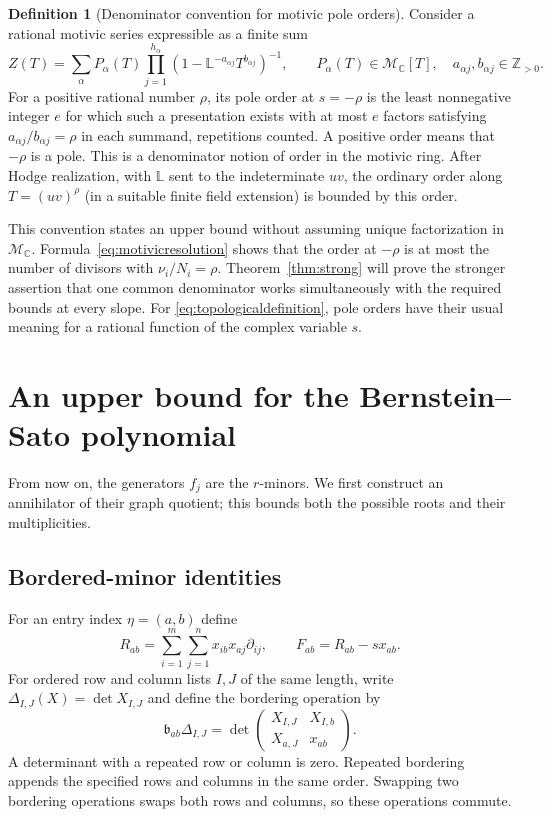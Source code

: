 \documentclass[11pt,a4paper]{article}
\numberwithin{equation}{section}
\theoremstyle{definition}
\newtheorem{definition}[theorem]{Definition}
\newcommand{\C}{\mathbb C}
\newcommand{\Z}{\mathbb Z}
\begin{document}
\begin{definition}[Denominator convention for motivic pole orders]
\label{def:motivicorder}
Consider a rational motivic series expressible as a finite sum
\begin{equation}\label{eq:denominatorpresentation}
Z(T)=\sum_{\alpha}P_\alpha(T)
          \prod_{j=1}^{h_\alpha}
           (1-\mathbb L^{-a_{\alpha j}}T^{b_{\alpha j}})^{-1},
\qquad
P_\alpha(T)\in\mathcal M_{\C}[T],\quad
 a_{\alpha j},b_{\alpha j}\in\Z_{>0}.
\end{equation}
For a positive rational number $\rho$, its pole order at
$s=-\rho$ is the least nonnegative integer $e$ for which such a
presentation exists with at most $e$ factors satisfying
$a_{\alpha j}/b_{\alpha j}=\rho$ in each summand, repetitions counted.
A positive order means that $-\rho$ is a pole. This is a denominator
notion of order in the motivic ring. After Hodge realization, with $\mathbb L$ sent to the indeterminate
$uv$, the ordinary order along $T=(uv)^\rho$ (in a suitable finite
field extension) is bounded by this order.
\end{definition}

This convention states an upper bound without assuming unique
factorization in $\mathcal M_{\C}$. Formula~\eqref{eq:motivicresolution}
shows that the order at $-\rho$ is at most the number of divisors
with $\nu_i/N_i=\rho$. Theorem~\ref{thm:strong} will prove the
stronger assertion that one common denominator works simultaneously
with the required bounds at every slope. For
\eqref{eq:topologicaldefinition}, pole orders have their usual meaning
for a rational function of the complex variable $s$.

\section{An upper bound for the Bernstein--Sato polynomial}\label{sec:upper}
From now on, the generators $f_j$ are the $r$-minors. We first
construct an annihilator of their graph quotient; this bounds both
the possible roots and their multiplicities.

\subsection{Bordered-minor identities}\label{subsec:border}

For an entry index $\eta=(a,b)$ define
\[
R_{ab}=\sum_{i=1}^m\sum_{j=1}^n x_{ib}x_{aj}\partial_{ij},
\qquad F_{ab}=R_{ab}-sx_{ab}.
\]
For ordered row and column lists $I,J$ of the same length, write
$\Delta_{I,J}(X)=\det X_{I,J}$ and define the bordering operation by
\[
\mathfrak b_{ab}\Delta_{I,J}
=\det\begin{pmatrix}X_{I,J}&X_{I,b}\\ X_{a,J}&x_{ab}\end{pmatrix}.
\]
A determinant with a repeated row or column is zero. Repeated bordering
appends the specified rows and columns in the same order. Swapping two
bordering operations swaps both rows and columns, so these operations
commute.
\end{document}
